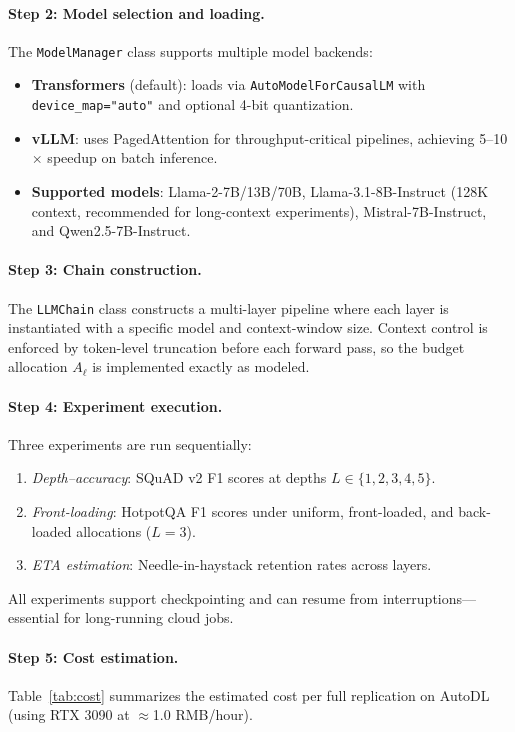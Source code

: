 \paragraph{Step 2: Model selection and loading.} The \texttt{ModelManager} class supports multiple model backends:
\begin{itemize}
\item \textbf{Transformers} (default): loads via \texttt{AutoModelForCausalLM} with \texttt{device\_map="auto"} and optional 4-bit quantization.
\item \textbf{vLLM}: uses PagedAttention for throughput-critical pipelines, achieving 5--10$\times$ speedup on batch inference.
\item \textbf{Supported models}: Llama-2-7B/13B/70B, Llama-3.1-8B-Instruct (128K context, recommended for long-context experiments), Mistral-7B-Instruct, and Qwen2.5-7B-Instruct.
\end{itemize}

\paragraph{Step 3: Chain construction.} The \texttt{LLMChain} class constructs a multi-layer pipeline where each layer is instantiated with a specific model and context-window size. Context control is enforced by token-level truncation before each forward pass, so the budget allocation $A_{\ell}$ is implemented exactly as modeled.

\paragraph{Step 4: Experiment execution.} Three experiments are run sequentially:
\begin{enumerate}
\item \textit{Depth--accuracy}: SQuAD v2 F1 scores at depths $L \in \{1, 2, 3, 4, 5\}$.
\item \textit{Front-loading}: HotpotQA F1 scores under uniform, front-loaded, and back-loaded allocations ($L = 3$).
\item \textit{ETA estimation}: Needle-in-haystack retention rates across layers.
\end{enumerate}
All experiments support checkpointing and can resume from interruptions---essential for long-running cloud jobs.

\paragraph{Step 5: Cost estimation.} Table~\ref{tab:cost} summarizes the estimated cost per full replication on AutoDL (using RTX 3090 at $\approx$1.0 RMB/hour).

